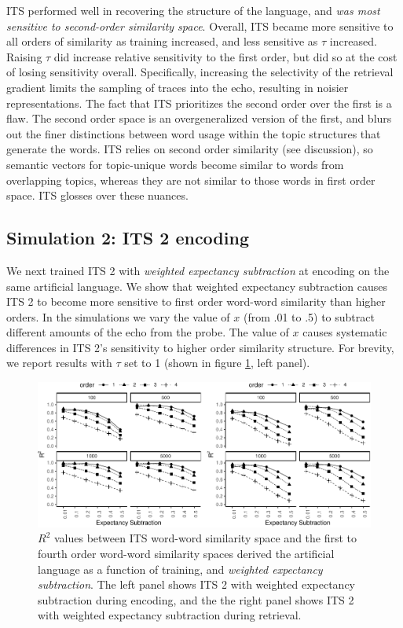 \documentclass[10pt,letterpaper]{article}
\begin{document}
ITS performed well in recovering the structure of the language, and \emph{was most sensitive to second-order similarity space}. Overall, ITS became more sensitive to all orders of similarity as training increased, and less sensitive as $\tau$ increased. Raising $\tau$ did increase relative sensitivity to the first order, but did so at the cost of losing sensitivity overall. Specifically, increasing the selectivity of the retrieval gradient limits the sampling of traces into the echo, resulting in noisier representations. The fact that ITS prioritizes the second order over the first is a flaw. The second order space is an overgeneralized version of the first, and blurs out the finer distinctions between word usage within the topic structures that generate the words. ITS relies on second order similarity (see discussion), so semantic vectors for topic-unique words become similar to words from overlapping topics, whereas they are not similar to those words in first order space. ITS glosses over these nuances.

\subsection{Simulation 2: ITS 2 encoding}

We next trained ITS 2 with \emph{weighted expectancy subtraction} at encoding on the same artificial language. We show that weighted expectancy subtraction causes ITS 2 to become more sensitive to first order word-word similarity than higher orders. In the simulations we vary the value of \(x\) (from .01 to .5) to subtract different amounts of the echo from the probe. The value of \(x\) causes systematic differences in ITS 2's sensitivity to higher order similarity structure. For brevity, we report results with \(\tau\) set to 1 (shown in figure \ref{fig:allsims}, left panel).

\begin{figure}

\includegraphics[width=\textwidth]{ITS_cogsci_files/figure-latex/allsims-1.pdf}

\caption{\(R^2\) values between ITS word-word similarity space and the first to fourth order word-word similarity spaces derived the artificial language as a function of training, and \emph{weighted expectancy subtraction}. The left panel shows ITS 2 with weighted expectancy subtraction during encoding, and the the right panel shows ITS 2 with weighted expectancy subtraction during retrieval.}\label{fig:allsims}
\end{figure}
\end{document}
